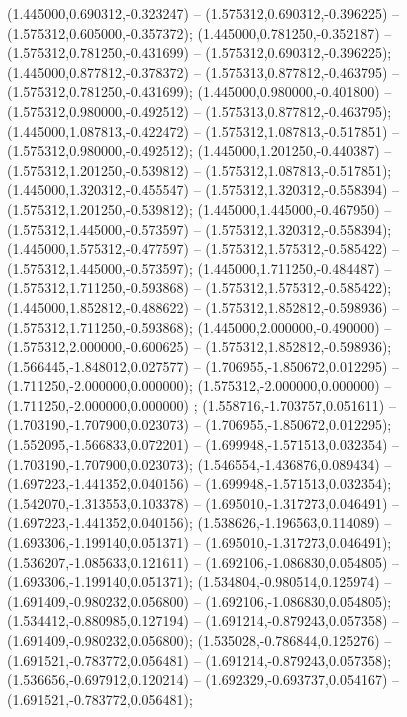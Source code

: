  (1.445000,0.690312,-0.323247) -- (1.575312,0.690312,-0.396225) -- (1.575312,0.605000,-0.357372);
 (1.445000,0.781250,-0.352187) -- (1.575312,0.781250,-0.431699) -- (1.575312,0.690312,-0.396225);
 (1.445000,0.877812,-0.378372) -- (1.575313,0.877812,-0.463795) -- (1.575312,0.781250,-0.431699);
 (1.445000,0.980000,-0.401800) -- (1.575312,0.980000,-0.492512) -- (1.575313,0.877812,-0.463795);
 (1.445000,1.087813,-0.422472) -- (1.575312,1.087813,-0.517851) -- (1.575312,0.980000,-0.492512);
 (1.445000,1.201250,-0.440387) -- (1.575312,1.201250,-0.539812) -- (1.575312,1.087813,-0.517851);
 (1.445000,1.320312,-0.455547) -- (1.575312,1.320312,-0.558394) -- (1.575312,1.201250,-0.539812);
 (1.445000,1.445000,-0.467950) -- (1.575312,1.445000,-0.573597) -- (1.575312,1.320312,-0.558394);
 (1.445000,1.575312,-0.477597) -- (1.575312,1.575312,-0.585422) -- (1.575312,1.445000,-0.573597);
 (1.445000,1.711250,-0.484487) -- (1.575312,1.711250,-0.593868) -- (1.575312,1.575312,-0.585422);
 (1.445000,1.852812,-0.488622) -- (1.575312,1.852812,-0.598936) -- (1.575312,1.711250,-0.593868);
 (1.445000,2.000000,-0.490000) -- (1.575312,2.000000,-0.600625) -- (1.575312,1.852812,-0.598936);
 (1.566445,-1.848012,0.027577) -- (1.706955,-1.850672,0.012295) -- (1.711250,-2.000000,0.000000);
 (1.575312,-2.000000,0.000000) -- (1.711250,-2.000000,0.000000) ;
 (1.558716,-1.703757,0.051611) -- (1.703190,-1.707900,0.023073) -- (1.706955,-1.850672,0.012295);
 (1.552095,-1.566833,0.072201) -- (1.699948,-1.571513,0.032354) -- (1.703190,-1.707900,0.023073);
 (1.546554,-1.436876,0.089434) -- (1.697223,-1.441352,0.040156) -- (1.699948,-1.571513,0.032354);
 (1.542070,-1.313553,0.103378) -- (1.695010,-1.317273,0.046491) -- (1.697223,-1.441352,0.040156);
 (1.538626,-1.196563,0.114089) -- (1.693306,-1.199140,0.051371) -- (1.695010,-1.317273,0.046491);
 (1.536207,-1.085633,0.121611) -- (1.692106,-1.086830,0.054805) -- (1.693306,-1.199140,0.051371);
 (1.534804,-0.980514,0.125974) -- (1.691409,-0.980232,0.056800) -- (1.692106,-1.086830,0.054805);
 (1.534412,-0.880985,0.127194) -- (1.691214,-0.879243,0.057358) -- (1.691409,-0.980232,0.056800);
 (1.535028,-0.786844,0.125276) -- (1.691521,-0.783772,0.056481) -- (1.691214,-0.879243,0.057358);
 (1.536656,-0.697912,0.120214) -- (1.692329,-0.693737,0.054167) -- (1.691521,-0.783772,0.056481);

